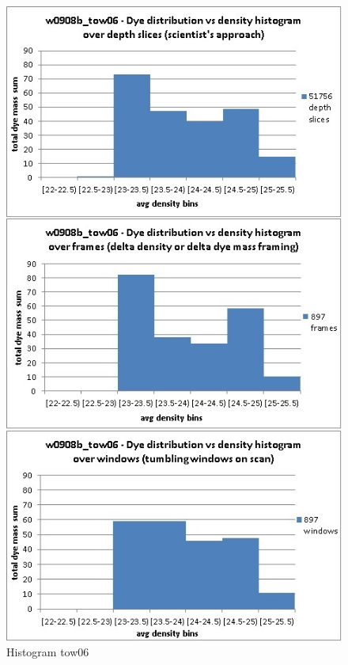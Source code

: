 \documentclass{vldb}
\begin{document}
\begin{figure}[tb]
   \centering
   \includegraphics[width=.99\columnwidth]{figures/histogram_tow06}
   \caption{Histogram tow06}
   \label{fig:eval-histogram-tow06}
\end{figure}
\end{document}

